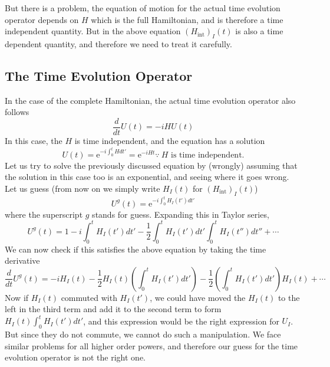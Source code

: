 \documentclass[11pt, notitlepage]{report}
\newcommand{\e}{\mathrm{e}}
\numberwithin{equation}{section}
\begin{document}
    But there is a problem, the equation of motion for the actual time evolution operator depends on \(H\) which is the full Hamiltonian, and is therefore a time independent quantity. But in the above equation \((H_{\text{int}})_I(t)\) is also a time dependent quantity, and therefore we need to treat it carefully.

    \subsection{The Time Evolution Operator}
    In the case of the complete Hamiltonian, the actual time evolution operator also follows
    \begin{equation*}
        \frac{d}{dt}U(t) = -iHU(t)
    \end{equation*}
    In this case, the \(H\) is time independent, and the equation has a solution 
    \begin{equation*}
        U(t) = \e^{-i\int_0^t Hdt'} = \e^{-iHt} \because ~H \text{ is time independent.}
    \end{equation*}
    Let us try to solve the previously discussed equation by (wrongly) assuming that the solution in this case too is an exponential, and seeing where it goes wrong. Let us guess (from now on we simply write \(H_I(t)\) for \((H_\text{int})_I(t)\))
    \begin{equation*}
        U^g(t) = \e^{-i\int_0^{t} H_I(t') dt'}
    \end{equation*} 
    where the superscript \(g\) stands for guess. Expanding this in Taylor series, 
    \begin{equation*}
        U^g(t) = 1 - i\int_0^t H_I(t') dt' - \frac{1}{2} \int_0^t H_I(t') dt' \int_0^t H_I(t'') dt'' + \cdots
    \end{equation*}
    We can now check if this satisfies the above equation by taking the time derivative
    \begin{equation*}
        \frac{d}{dt}U^g(t) = -iH_I(t) - \frac{1}{2} H_I(t) \left(\int_0^t H_I(t')dt'\right) - \frac{1}{2} \left(\int_0^t H_I(t') dt'\right) H_I(t) + \cdots
    \end{equation*}
    Now if \(H_I(t)\) commuted with \(H_I(t')\), we could have moved the \(H_I(t)\) to the left in the third term and add it to the second term to form \(H_I(t) \int_0^t H_I(t')dt'\), and this expression would be the right expression for \(U_I\). But since they do not commute, we cannot do such a manipulation. We face similar problems for all higher order powers, and therefore our guess for the time evolution operator is not the right one.\\
\end{document}
